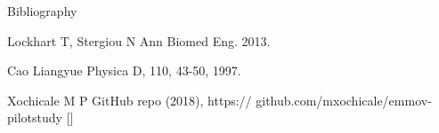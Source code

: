 \documentclass[compress]{beamer}
\begin{document}
\begin{frame}{Bibliography}
    \begin{thebibliography}{10}

\beamertemplatearticlebibitems


      Lockhart T, Stergiou N 
      \newblock {}
	\newblock Ann Biomed Eng. 2013.

      Cao Liangyue
      \newblock {}
      \newblock Physica D, 110, 43-50, 1997.  

      Xochicale M P
      \newblock {}
      \newblock GitHub repo (2018), https:// github.com/mxochicale/emmov-pilotstudy [\href{https:// github.com/mxochicale/emmov-pilotstudy}{\faGithub}]


    \end{thebibliography}
\end{frame}




\closingtitle


\end{document}
